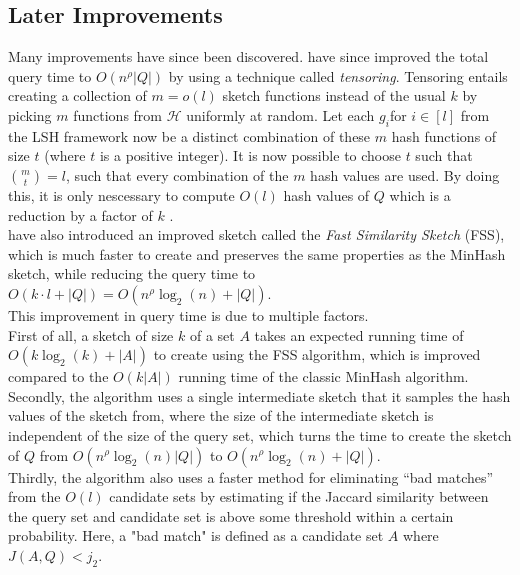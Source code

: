 \subsection{Later Improvements}
Many improvements have since been discovered.
\citet{andoni2006efficient} have since improved the total query time to $O(n^\rho|Q|)$ by using a technique called \textit{tensoring}. Tensoring entails creating a collection of $m=o(l)$ sketch functions instead of the usual $k$ by picking $m$ functions from $\mathcal{H}$ uniformly at random. Let each $g_i$for $i\in [l]$ from the LSH framework now be a distinct combination of these $m$ hash functions of size $t$ (where $t$ is a positive integer). It is now possible to choose $t$ such that ${m \choose t} = l$, such that every combination of the $m$ hash values are used. By doing this, it is only nescessary to compute $O(l)$ hash values of $Q$ which is a reduction by a factor of $k$ \cite{andoni2006efficient}\cite{christiani2018fast}.\\
\citet{dahlgaard2017fast} have also introduced an improved sketch called the \textit{Fast Similarity Sketch} (FSS), which is much faster to create and preserves the same properties as the MinHash sketch, while reducing the query time to $O(k\cdot l + |Q|)=O(n^\rho \log_2(n) + |Q|)$. \\
This improvement in query time is due to multiple factors.\\
First of all, a sketch of size $k$ of a set $A$ takes an expected running time of $O(k\log_2(k) + |A|)$ to create using the FSS algorithm, which is improved compared to the $O(k|A|)$ running time of the classic MinHash algorithm.\\
Secondly, the algorithm uses a single intermediate sketch that it samples the hash values of the sketch from, where the size of the intermediate sketch is independent of the size of the query set, which turns the time to create the sketch of $Q$ from $O(n^\rho \log_2(n)|Q|)$ to $O(n^\rho \log_2(n) + |Q|)$.\\
Thirdly, the algorithm also uses a faster method for eliminating ``bad matches'' from the $O(l)$ candidate sets by estimating if the Jaccard similarity between the query set and candidate set is above some threshold within a certain probability. Here, a "bad match" is defined as a candidate set $A$ where $J(A, Q) < j_2$.

